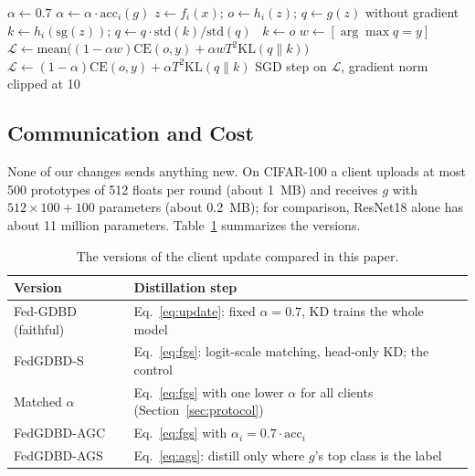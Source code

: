 \documentclass[conference]{IEEEtran}
\begin{document}
\begin{algorithm}[t]
\caption{Client distillation step in all four versions}
\label{alg:update}
\footnotesize
\begin{algorithmic}[1]
\State $\alpha \gets 0.7$ 
 $\alpha \gets \alpha \cdot \mathrm{acc}_i(g)$ 
\EndIf
{}
  \State $z \gets f_i(x)$; $o \gets h_i(z)$; $q \gets g(z)$ without gradient
   
    \State $k \gets h_i(\mathrm{sg}(z))$; $q \gets q\cdot\mathrm{std}(k)/\mathrm{std}(q)$
  \Else\ $k \gets o$ 
  \EndIf
   
    \State $w \gets [\arg\max q = y]$
    \State $\mathcal{L} \gets \mathrm{mean}\big((1-\alpha w)\mathrm{CE}(o,y) + \alpha w T^2\mathrm{KL}(q\|k)\big)$
  \Else\ $\mathcal{L} \gets (1-\alpha)\mathrm{CE}(o,y) + \alpha T^2\mathrm{KL}(q\|k)$
  \EndIf
  \State SGD step on $\mathcal{L}$, gradient norm clipped at 10
\EndFor
\end{algorithmic}
\end{algorithm}

\subsection{Communication and Cost}
None of our changes sends anything new. On CIFAR-100 a client uploads at most 500 prototypes of 512 floats per round (about 1~MB) and receives $g$ with $512\times100+100$ parameters (about 0.2~MB); for comparison, ResNet18 alone has about 11 million parameters. Table~\ref{tab:versions} summarizes the versions.

\begin{table}[t]
\centering
\caption{The versions of the client update compared in this paper.}
\label{tab:versions}
\footnotesize
\begin{tabularx}{\columnwidth}{>{\raggedright\arraybackslash}p{1.9cm}>{\raggedright\arraybackslash}X}
\toprule
Version & Distillation step \\
\midrule
Fed-GDBD (faithful) & Eq.~\eqref{eq:update}: fixed $\alpha=0.7$, KD trains the whole model \\
FedGDBD-S & Eq.~\eqref{eq:fgs}: logit-scale matching, head-only KD; the control \\
Matched $\alpha$ & Eq.~\eqref{eq:fgs} with one lower $\alpha$ for all clients (Section~\ref{sec:protocol}) \\
FedGDBD-AGC & Eq.~\eqref{eq:fgs} with $\alpha_i=0.7\cdot\mathrm{acc}_i$ \\
FedGDBD-AGS & Eq.~\eqref{eq:ags}: distill only where $g$'s top class is the label \\
\bottomrule
\end{tabularx}
\end{table}
\end{document}

